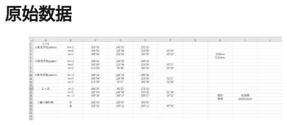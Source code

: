 \documentclass[UTF8]{ctexart}
\begin{document}
\section{原始数据}
\begin{figure}[H]\begin{center}
    \includegraphics[scale=0.5]{data.PNG}
\end{center}\end{figure}
\end{document}
